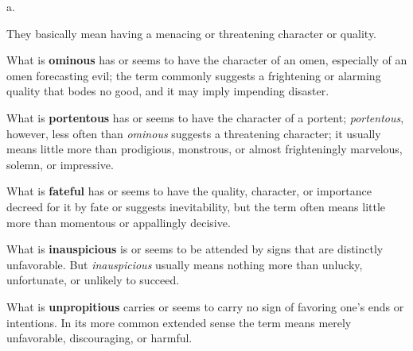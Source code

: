 \begin{description}[style=unboxed]
 a.
\begin{mynewitemize}
\item They basically mean having a menacing or threatening character or quality. 
\item What is \textbf{ominous} has or seems to have the character of an omen,
especially of an omen forecasting evil; the term commonly suggests a frightening
or alarming quality that bodes no good, and it may imply impending disaster.
\item What is \textbf{portentous} has or seems to have the character of a portent;
\textit{portentous}, however, less often than \textit{ominous} suggests a threatening
character; it usually means little more than prodigious, monstrous, or almost
frighteningly marvelous, solemn, or impressive.
\item What is \textbf{fateful} has or seems to have the quality, character, or
importance decreed for it by fate or suggests inevitability, but the term often 
means little more than momentous or appallingly decisive.
\item What is \textbf{inauspicious} is or seems to be attended by signs that are
distinctly unfavorable. But \textit{inauspicious} usually means nothing more than
unlucky, unfortunate, or unlikely to succeed.
\item What is \textbf{unpropitious} carries or seems to carry no sign of favoring
one's ends or intentions. In its more common extended sense the term means merely
unfavorable, discouraging, or harmful.
\end{mynewitemize}


\end{description}
